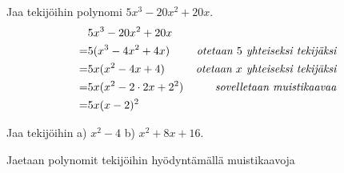 \begin{esimerkki}
Jaa tekijöihin polynomi $5x^3-20x^2+20x$.
\begin{align*}
& 5x^3-20x^2+20x \\
=& 5(x^3-4x^2+4x) \ \ \ \ &\emph{otetaan $5$ yhteiseksi tekijäksi} \\
=& 5x(x^2-4x+4) &\emph{otetaan $x$ yhteiseksi tekijäksi} \\
=& 5x(x^2-2\cdot 2x+2^2) &\emph{sovelletaan muistikaavaa} \\
=& 5x(x-2)^2
\end{align*}
\end{esimerkki}

\begin{esimerkki}
Jaa tekijöihin \quad a) $x^2-4$ \quad b) $x^2+8x+16.$

Jaetaan polynomit tekijöihin hyödyntämällä muistikaavoja
\begin{alakohdat}
\end{alakohdat}
\end{esimerkki}


